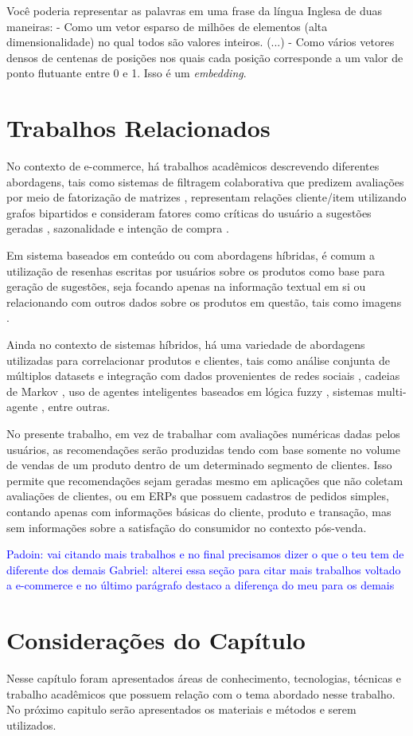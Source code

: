 \begin{citacao}
Você poderia representar as palavras em uma frase da língua Inglesa de duas maneiras: - Como um vetor esparso de milhões de elementos (alta dimensionalidade) no qual todos são valores inteiros. (...) - Como vários vetores densos de centenas de posições nos quais cada posição corresponde a um valor de ponto flutuante entre 0 e 1. Isso é um \textit{embedding}.
\end{citacao}

\section{Trabalhos Relacionados} \label{trabs-rel}
\label{trab-relacionados} 
No contexto de e-commerce, há trabalhos acadêmicos descrevendo diferentes abordagens, tais como sistemas de filtragem colaborativa que predizem avaliações por meio de fatorização de matrizes \cite{he17}, representam relações cliente/item utilizando grafos bipartidos \cite{wang19} e consideram fatores como críticas do usuário a sugestões geradas \cite{burke02} , sazonalidade e intenção de compra \cite{hwangbo18}.

Em sistema baseados em conteúdo ou com abordagens híbridas, é comum a utilização de resenhas escritas por usuários sobre os produtos como base para geração de sugestões, seja focando apenas na informação textual em si \cite{shoja19} ou relacionando com outros dados sobre os produtos em questão, tais como imagens \cite{wu20}.

Ainda no contexto de sistemas híbridos, há uma variedade de abordagens utilizadas para correlacionar produtos e clientes, tais como análise conjunta de múltiplos datasets e integração com dados provenientes de redes sociais \cite{li16}, cadeias de Markov \cite{yang20}, uso de agentes inteligentes baseados em lógica fuzzy \cite{yager00}, sistemas multi-agente \cite{aciar07}, entre outras.

No presente trabalho, em vez de trabalhar com avaliações numéricas dadas pelos usuários, as recomendações serão produzidas tendo com base somente no volume de vendas de um produto dentro de um determinado segmento de clientes. Isso permite que recomendações sejam geradas mesmo em aplicações que não coletam avaliações de clientes, ou em ERPs que possuem cadastros de pedidos simples, contando apenas com informações básicas do cliente, produto e transação, mas sem informações sobre a satisfação do consumidor no contexto pós-venda.

\textcolor{blue}{Padoin: vai citando mais trabalhos e no final precisamos dizer o que o teu tem de diferente dos demais}
\newline
\textcolor{blue}{Gabriel: alterei essa seção para citar mais trabalhos voltado a e-commerce e no último parágrafo destaco a diferença do meu para os demais}

\section{Considerações do Capítulo} \label{consid1}
Nesse capítulo foram apresentados áreas de conhecimento, tecnologias, técnicas e trabalho acadêmicos que possuem relação com o tema abordado nesse trabalho. No próximo capitulo serão apresentados os materiais e métodos e serem utilizados.
